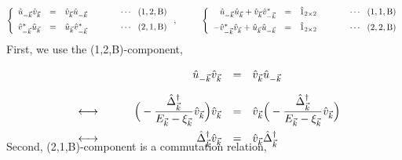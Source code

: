 \documentclass[uplatex,a4j,12pt,dvipdfmx]{jsarticle}
\begin{document}
	\begin{eqnarray}
		\left\{
		\begin{array}{rccl}
			\hat{u}_{-\vec{k}} \hat{v}_{\vec{k}}
			 & =                                      &
			\hat{v}_{\vec{k}} \hat{u}_{-\vec{k}}
			 & \hspace{10mm} \cdots \ \ (1,2,{\rm B})
			\\[2mm]
			\hat{v}_{-\vec{k}}^{*} \hat{u}_{\vec{k}}
			 & =                                      &
			\hat{u}_{\vec{k}} \hat{v}_{-\vec{k}}^{*}
			 & \hspace{10mm} \cdots \ \ (2,1,{\rm B})
		\end{array}
		\right.
		,
		\hspace{10mm}
		\left\{
		\begin{array}{rccl}
			\hat{u}_{-\vec{k}} \hat{u}_{\vec{k}} + \hat{v}_{\vec{k}} \hat{v}_{-\vec{k}}^{*}
			 & =                                      &
			\hat{1}_{2 \times 2}
			 & \hspace{10mm} \cdots \ \ (1,1,{\rm B})
			\\[2mm]
			- \hat{v}_{-\vec{k}}^{*} \hat{v}_{\vec{k}} + \hat{u}_{\vec{k}} \hat{u}_{-\vec{k}}
			 & =                                      &
			\hat{1}_{2 \times 2}
			 & \hspace{10mm} \cdots \ \ (2,2,{\rm B})
		\end{array}
		\right.
	\end{eqnarray}
	First, we use the (1,2,B)-component,

	\begin{eqnarray}
		\begin{array}{rcrcl}
			 &   &
			\hat{u}_{-\vec{k}} \hat{v}_{\vec{k}}
			 & = &
			\hat{v}_{\vec{k}} \hat{u}_{-\vec{k}}
			\nonumber \\[4mm] &\longleftrightarrow& \hspace{8mm}
			\Big( - \dfrac{ \hat{\Delta}^{\dagger}_{\vec{k}} }{ E_{\vec{k}} - \xi_{\vec{k}} } \hat{v}_{\vec{k}} \Big)
			\hat{v}_{\vec{k}}
			 & = &
			\hat{v}_{\vec{k}}
			\Big( - \dfrac{ \hat{\Delta}^{\dagger}_{\vec{k}} }{ E_{\vec{k}} - \xi_{\vec{k}} } \hat{v}_{\vec{k}} \Big)
			\nonumber \\[4mm] &\longleftrightarrow& \hspace{8mm}
			\hat{\Delta}^{\dagger}_{\vec{k}} \hat{v}_{\vec{k}}
			 & = &
			\hat{v}_{\vec{k}} \hat{\Delta}^{\dagger}_{\vec{k}}
		\end{array}
		\\[-5mm]
	\end{eqnarray}
	Second, (2,1,B)-component is a commutation relation,
\end{document}
